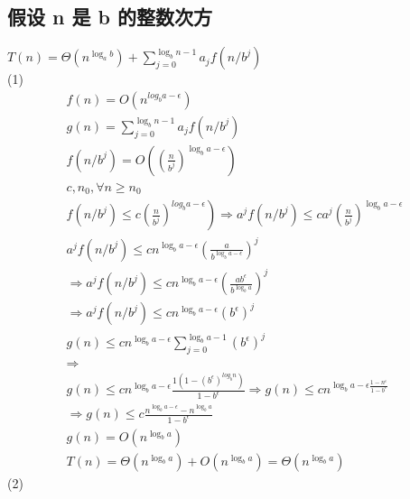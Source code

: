 \subsection{假设 n 是 b 的整数次方}
$T(n)=\Theta\left(n^{\log _{a} b}\right)+\sum_{j=0}^{\log _{b} n-1} a_{j} f\left(n / b^{j}\right)$\\
(1)
 $$
 \begin{array}{l}
f(n)=O\left(n^{l o g_{b} a-\epsilon}\right) \\
g(n)=\sum_{j=0}^{\log _{b} n-1} a_{j} f\left(n / b^{j}\right) \\
f\left(n / b^{j}\right)=O\left(\left(\frac{n}{b^{j}}\right)^{\log _{b} a-\epsilon}\right) \\
c, n_{0}, \forall n \geq n_{0} \\
\left.f\left(n / b^{j}\right) \leq c\left(\frac{n}{b^{j}}\right)^{l o g_{b} a-\epsilon}\right) \Rightarrow a^{j} f\left(n / b^{j}\right) \leq c a^{j}\left(\frac{n}{b^{j}}\right)^{\log _{b} a-\epsilon} \\
a^{j} f\left(n / b^{j}\right) \leq c n^{\log _{b} a-\epsilon}\left(\frac{a}{b^{\log _{b} a-\epsilon}}\right)^{j} \\
\Rightarrow a^{j} f\left(n / b^{j}\right) \leq c n^{\log _{b} a-\epsilon}\left(\frac{a b^{\epsilon}}{b^{\log _{b} a}}\right)^{j} \\
\Rightarrow a^{j} f\left(n / b^{j}\right) \leq c n^{\log _{b} a-\epsilon}\left(b^{\epsilon}\right)^{j} \\
g(n) \leq c n^{\log _{b} a-\epsilon} \sum_{j=0}^{\log _{b} a-1}\left(b^{\epsilon}\right)^{j} \\
\Rightarrow \\g(n) \leq c n^{\log _{b} a-\epsilon} \frac{1\left(1-\left(b^{\epsilon}\right)^{l o g_{b} n}\right)}{1-b^{\epsilon}}
\Rightarrow g(n) \leq c n^{\log _{b} a-\epsilon \frac{1-n^{\epsilon}}{1-b^{\epsilon}}} \\
\Rightarrow g(n) \leq c \frac{n^{\log _{b} a-\epsilon}-n^{\log _{b} a}}{1-b^{\epsilon}} \\
g(n)=O\left(n^{\log _{b} a}\right) \\
T(n)=\Theta\left(n^{\log _{b} a}\right)+O\left(n^{\log _{b} a}\right)=\Theta\left(n^{\log _{b} a}\right)
\end{array}
 $$
(2)
